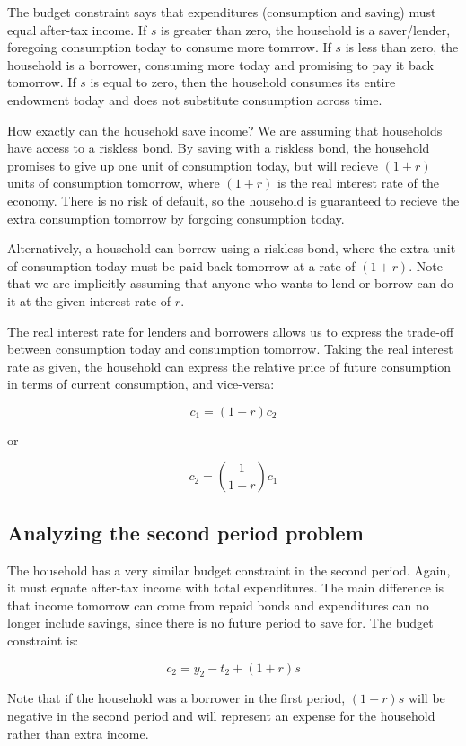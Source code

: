 \documentclass[12pt]{article}
\begin{document}
The budget constraint says that expenditures (consumption and saving) must equal after-tax income. If \(s\) is greater than zero, the household is a saver/lender, foregoing consumption today to consume more tomrrow. If \(s\) is less than zero, the household is a borrower, consuming more today and promising to pay it back tomorrow. If \(s\) is equal to zero, then the household consumes its entire endowment today and does not substitute consumption across time.

How exactly can the household save income? We are assuming that households have access to a riskless bond. By saving with a riskless bond, the household promises to give up one unit of consumption today, but will recieve \((1+r)\) units of consumption tomorrow, where \((1+r)\) is the real interest rate of the economy. There is no risk of default, so the household is guaranteed to recieve the extra consumption tomorrow by forgoing consumption today.

Alternatively, a household can borrow using a riskless bond, where the extra unit of consumption today must be paid back tomorrow at a rate of \((1+r)\). Note that we are implicitly assuming that anyone who wants to lend or borrow can do it at the given interest rate of \(r\). 

The real interest rate for lenders and borrowers allows us to express the trade-off between consumption today and consumption tomorrow. Taking the real interest rate as given, the household can express the relative price of future consumption in terms of current consumption, and vice-versa:

\[ c_1 = (1+r) c_2 \]

or 

\[ c_2 = \left( \frac{1}{1+r} \right) c_1 \]

\subsection{Analyzing the second period problem}

The household has a very similar budget constraint in the second period. Again, it must equate after-tax income with total expenditures. The main difference is that income tomorrow can come from repaid bonds and expenditures can no longer include savings, since there is no future period to save for. The budget constraint is:

\[ c_2 = y_2 - t_2 + (1+r) s \]

Note that if the household was a borrower in the first period, \((1+r) s \) will be negative in the second period and will represent an expense for the household rather than extra income.
\end{document}
